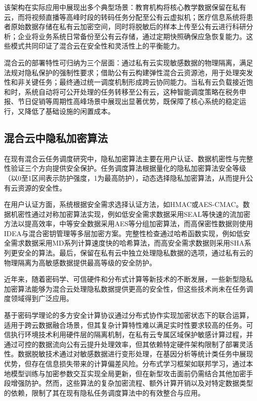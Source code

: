该架构在实际应用中展现出多个典型场景：教育机构将核心教学数据保留在私有云，而将视频直播等高峰时段的转码任务分配至公有云虚拟机；医疗信息系统将患者原始数据存储在私有云加密空间，同时将脱敏后的样本上传至公有云进行科研分析；企业将业务系统日常备份至公有云存储，通过定期快照确保应急恢复能力。这些模式共同印证了混合云在安全性和灵活性上的平衡能力。

混合云的部署特性可归纳为三个层面：通过私有云实现敏感数据的物理隔离，满足法规对隐私保护的强制性要求；借助公有云构建弹性混合云资源池，用于处理突发性和非关键任务；最终通过统一调度机制形成跨云协同能力。当私有云负载接近饱和时，系统自动将可公开处理的任务转移至公有云，这种智能调度策略在税务申报、节日促销等周期性高峰场景中展现出显著优势，既保障了核心系统的稳定运行，又降低了基础设施的闲置成本。

\subsection{混合云中隐私加密算法}

在现有混合云任务调度研究中，隐私加密算法主要在用户认证、数据机密性与完整性验证三个方向提供安全保护。任务调度算法根据量化的隐私加密算法安全等级（以0至1区间表示防护强度，1为最高防护），动态选择隐私加密算法，从而提升公有云资源的安全性\cite{wangSecurityawareTaskScheduling2021, leiPrivacySecurityawareWorkflow2022}。

在用户认证方面，系统根据安全需求选择认证方法，如HMAC或AES-CMAC。数据机密性通过对称加密算法实现，例如低安全需求数据采用SEAL等快速的流加密方法以提高效率，中等安全数据采用AES等分组加密算法，而高保密性数据则使用IDEA与混合密钥管理等多层加密方案。完整性检查通过哈希函数实现，例如低安全需求数据采用MD系列计算速度快的哈希算法，而高安全需求数据则采用SHA系列更安全的算法。最后，保留在私有云中独立处理隐私数据的选项，通过私有云的物理隔离为高敏感数据提供最高等级的安全防护。

近年来，随着密码学、可信硬件和分布式计算等新技术的不断发展，一些新型隐私加密算法能够为混合云处理隐私数据提供更高的安全性，但这些技术尚未在任务调度领域得到广泛应用。

基于密码学理论的多方安全计算协议通过分布式协作实现加密状态下的联合运算，适用于跨云数据融合场景，但其复杂计算特性难以满足实时性要求较高的任务。可信执行环境技术利用硬件层的隔离机制，在私有云专属区域保护敏感计算过程，并通过可控的数据流向公有云提升处理效率，但其依赖特定硬件架构限制了部署灵活性。数据脱敏技术通过对敏感数据进行变形处理，在基因分析等统计类任务中展现优势，但存在信息损失带来的计算偏差风险。分布式学习框架如联邦学习，通过本地模型训练与加密参数交互实现全局更新，但在新型攻击面前仍需结合其他加密手段增强防护。然而，这些算法的复杂加密流程、额外计算开销以及对特定数据类型的依赖，限制了其在现有隐私任务调度算法中的有效整合与应用。

